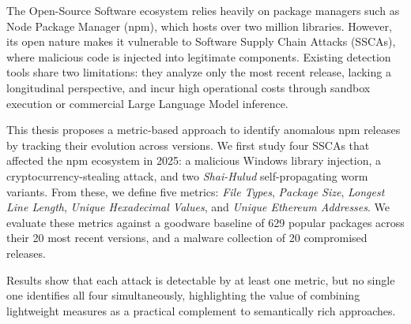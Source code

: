 The Open-Source Software ecosystem relies heavily on package managers such as Node Package Manager (npm), 
which hosts over two million libraries. 
However, its open nature makes it vulnerable to Software Supply Chain Attacks (SSCAs), 
where malicious code is injected into legitimate components. 
Existing detection tools share two limitations: 
they analyze only the most recent release, lacking a longitudinal perspective, 
and incur high operational costs through sandbox execution or commercial Large Language Model inference.

This thesis proposes a metric-based approach to identify anomalous npm releases 
by tracking their evolution across versions. 
We first study four SSCAs that affected the npm ecosystem in 2025: 
a malicious Windows library injection, a cryptocurrency-stealing attack, 
and two \emph{Shai-Hulud} self-propagating worm variants. 
From these, we define five metrics: 
\emph{File Types}, \emph{Package Size}, \emph{Longest Line Length}, \emph{Unique Hexadecimal Values}, and \emph{Unique Ethereum Addresses}.
We evaluate these metrics against a goodware baseline of 629 popular packages across their 20 most recent versions, 
and a malware collection of 20 compromised releases. 

Results show that each attack is detectable by at least one metric, 
but no single one identifies all four simultaneously, 
highlighting the value of combining lightweight measures 
as a practical complement to semantically rich approaches.